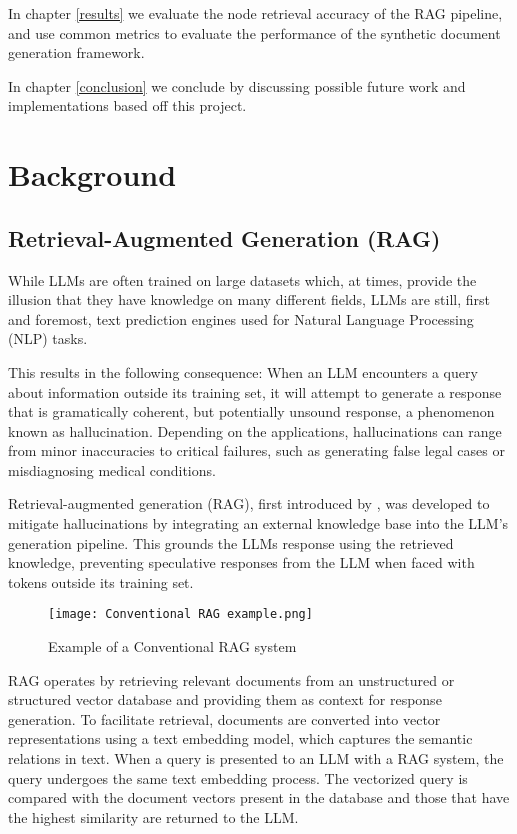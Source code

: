 In chapter \ref{results} we evaluate the node retrieval accuracy of the RAG pipeline, and use common metrics to evaluate the performance of the synthetic document generation framework.

In chapter \ref{conclusion} we conclude by discussing possible future work and implementations based off this project.

\section{Background}

\subsection{Retrieval-Augmented Generation (RAG)}
While LLMs are often trained on large datasets which, at times, provide the illusion that they have knowledge on many different fields, LLMs are still, first and foremost, text prediction engines used for Natural Language Processing (NLP) tasks.

This results in the following consequence: When an LLM encounters a query about information outside its training set, it will attempt to generate a response that is gramatically coherent, but potentially unsound response, a phenomenon known as hallucination. Depending on the applications, hallucinations can range from minor inaccuracies to critical failures, such as generating false legal cases \autocite{Bohannon_2024} or misdiagnosing medical conditions.

Retrieval-augmented generation (RAG), first introduced by \autocite{lewis2021retrievalaugmentedgenerationknowledgeintensivenlp}, was developed to mitigate hallucinations by integrating an external knowledge base into the LLM's generation pipeline. This grounds the LLMs response using the retrieved knowledge, preventing speculative responses from the LLM when faced with tokens outside its training set.

\begin{figure}
	\texttt{[image: Conventional RAG example.png]}
	\caption{Example of a Conventional RAG system}
	\centering
	\label{fig:RAGexample}
\end{figure}

RAG operates by retrieving relevant documents from an unstructured or structured vector database and providing them as context for response generation. To facilitate retrieval, documents are converted into vector representations using a text embedding model, which captures the semantic relations in text. When a query is presented to an LLM with a RAG system, the query undergoes the same text embedding process. The vectorized query is compared with the document vectors present in the database and those that have the highest similarity are returned to the LLM.

